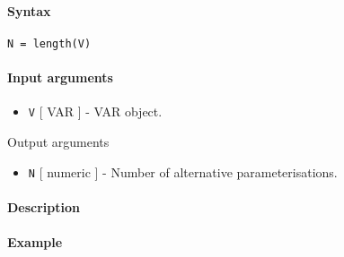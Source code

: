 


	\paragraph{Syntax}\label{syntax}

\begin{verbatim}
N = length(V)
\end{verbatim}

\paragraph{Input arguments}\label{input-arguments}

\begin{itemize}
\itemsep1pt\parskip0pt
\item
  \texttt{V} {[} VAR {]} - VAR object.
\end{itemize}

Output arguments

\begin{itemize}
\itemsep1pt\parskip0pt
\item
  \texttt{N} {[} numeric {]} - Number of alternative parameterisations.
\end{itemize}

\paragraph{Description}\label{description}

\paragraph{Example}\label{example}


